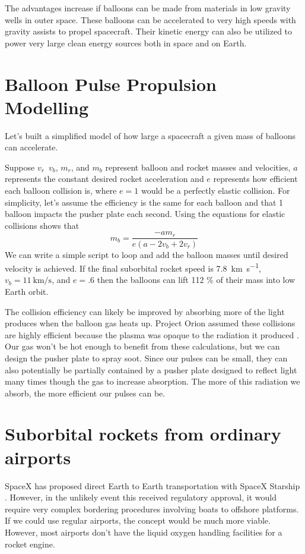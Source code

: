 \documentclass{article}
\begin{document}
The advantages increase if balloons can be made from materials in low gravity wells in outer space.   These balloons can be accelerated to very high speeds with gravity assists to propel spacecraft.   Their kinetic energy can also be utilized to power very large clean energy sources both in space and on Earth.  



\section{Balloon Pulse Propulsion Modelling}
\label{sec:pulse_modelling}
Let's built a simplified model of how large a spacecraft a given mass of balloons can accelerate.

Suppose \(v_r\)\,  \(v_b\),  \(m_r\), and \(m_b\) represent balloon and rocket masses and velocities,    \(a\) represents the constant desired rocket acceleration and \(e\) represents how efficient each balloon collision is, where \(e=1\) would be a perfectly elastic collision.   For simplicity, let's assume the efficiency is the same for each balloon and that 1 balloon impacts the pusher plate each second.   Using the equations for elastic collisions shows that 
\begin{equation}
m_b=\frac{-am_r}{e(a - 2v_b + 2v_r)}
\label{eq:balloon_mass}
\end{equation}
We can write a simple script to loop and add the balloon masses until desired velocity is achieved.   If the final suborbital rocket speed is \SI{7.8}{\kilo\metre\per\second}, \(v_b=\SI{11}{\kilo\metre\per\second}\), and \(e=.6\) then the balloons can lift 112 \% of their mass into low Earth orbit.   

The collision efficiency can likely be improved by absorbing more of the light produces when the balloon gas heats up.   Project Orion assumed these collisions are highly efficient because the plasma was opaque to the radiation it produced \cite{orion_reflections}.  Our gas won't be hot enough to benefit from these calculations, but we can design the pusher plate to spray soot.   Since our pulses can be small, they can also potentially be partially contained by a pusher plate designed to reflect light many times though the gas to increase absorption.   The more of this radiation we absorb, the more efficient our pulses can be.  

\section{Suborbital rockets from ordinary airports}\label{sec:suborbital_airports}
SpaceX has proposed direct Earth to Earth transportation with SpaceX Starship \cite{spacex_earth_earth}.   However, in the unlikely event this received regulatory approval, it would require very complex bordering procedures involving boats to offshore platforms.   If we could use regular airports, the concept would be much more viable.    However, most airports don't have the liquid oxygen handling facilities for a rocket engine.
\end{document}
